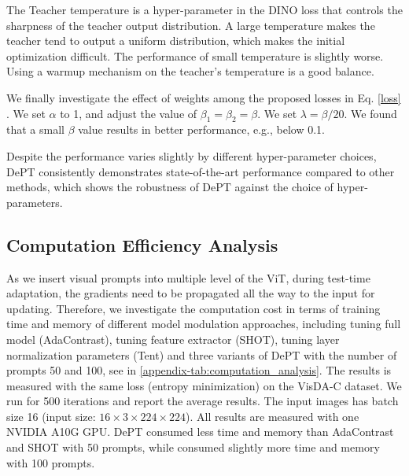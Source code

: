 \documentclass{article} \usepackage{iclr2023_conference,times}
\begin{document}
The Teacher temperature is a hyper-parameter in the DINO loss that controls the sharpness of the teacher output distribution. A large temperature makes the teacher tend to output a uniform distribution, which makes the initial optimization difficult. The performance of small temperature is slightly worse. Using a warmup mechanism on the teacher's temperature is a good balance.

We finally investigate the effect of weights among the proposed losses in Eq. \ref{loss} . We set $\alpha$ to 1, and adjust the value of $\beta_1=\beta_2=\beta$. We set $\lambda=\beta/20$. We found that a small $\beta$ value results in better performance, e.g., below 0.1.

Despite the performance varies slightly by different hyper-parameter choices, DePT consistently demonstrates state-of-the-art performance compared to other methods, which shows the robustness of DePT against the choice of hyper-parameters.

\begin{table}[h]
    \centering
    \footnotesize
\end{table}




\subsection{Computation Efficiency Analysis}
As we insert visual prompts into multiple level of the ViT, during test-time adaptation, the gradients need to be propagated all the way to the input for updating. Therefore, we investigate the computation cost in terms of training time and memory of different model modulation approaches, including tuning full model (AdaContrast), tuning feature extractor (SHOT), tuning layer normalization parameters (Tent) and three variants of DePT with the number of prompts 50 and 100, see in \ref{appendix-tab:computation_analysis}. The results is measured with the same loss (entropy minimization) on the VisDA-C dataset.  We run for 500 iterations and report the average results. The input images has batch size 16 (input size: $16\times3\times224\times224$). All results are measured with one NVIDIA A10G GPU.  DePT consumed less time and memory than AdaContrast and SHOT with 50 prompts, while consumed slightly more time and memory with 100 prompts.
\end{document}
